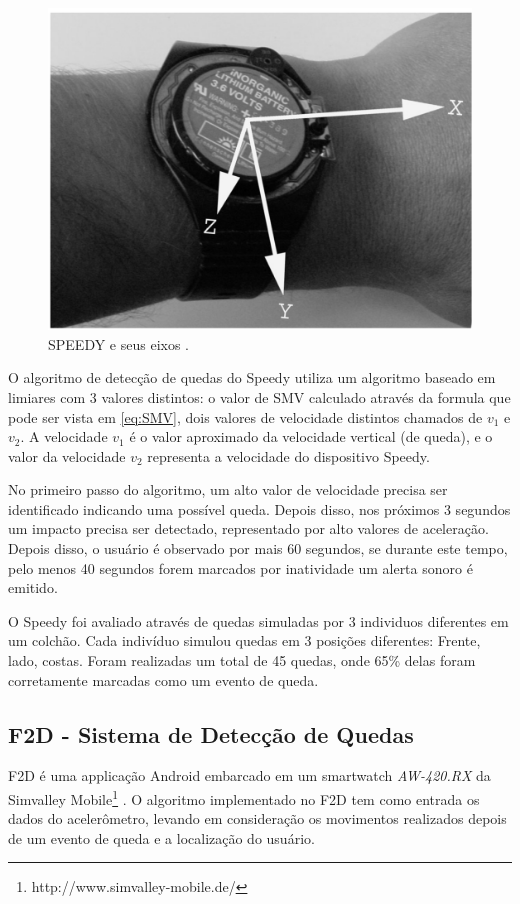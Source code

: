 \begin{figure}[ht]
	\centering
	\includegraphics[scale=0.5]{imagens/speedy.png}
	\caption{ SPEEDY e seus eixos \cite{degen2003speedy}.}
	\label{fig:speedy}
\end{figure} 

O algoritmo de detecção de quedas do Speedy utiliza um algoritmo baseado em limiares com 3 valores distintos: o valor de \ac{SMV} calculado através da formula que pode ser vista em \ref{eq:SMV}, dois valores de velocidade distintos chamados de $v_1$ e $v_2$. A velocidade $v_1$ é o valor aproximado da velocidade vertical (de queda), e o valor da velocidade $v_2$ representa a velocidade do dispositivo Speedy. 

No primeiro passo do algoritmo, um alto valor de velocidade precisa ser identificado indicando uma possível queda. Depois disso, nos próximos 3 segundos um impacto precisa ser detectado, representado por alto valores de aceleração. Depois disso, o usuário é observado por mais 60 segundos, se durante este tempo, pelo menos 40 segundos forem marcados por inatividade um alerta sonoro é emitido. 

O Speedy foi avaliado através de quedas simuladas por 3 individuos diferentes em um colchão. Cada indivíduo simulou  quedas em 3 posições diferentes: Frente, lado, costas. Foram realizadas um total de 45 quedas, onde 65\% delas foram corretamente marcadas como um evento de queda. 

\subsection{F2D - Sistema de Detecção de Quedas}
F2D é uma applicação Android embarcado em um smartwatch \textit{AW-420.RX} da Simvalley Mobile\footnote{http://www.simvalley-mobile.de/} \citep{kostopoulos2015f2d}. O algoritmo implementado no F2D tem como entrada os dados do acelerômetro, levando em consideração os movimentos realizados depois de um evento de queda e a localização do usuário. 

